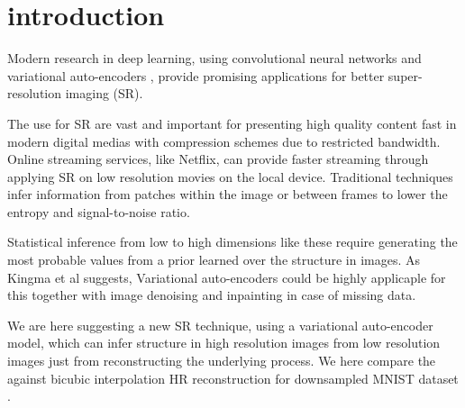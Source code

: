 \section{introduction}
\label{sec:introduction}
Modern research in deep learning, using convolutional neural networks \cite{Dong15} and variational auto-encoders \cite{Kingma2013} \cite{Johnson16}, provide promising applications for better super-resolution imaging (SR).  

The use for SR are vast and important for presenting high quality content fast in modern digital medias with compression schemes due to restricted bandwidth. Online streaming services, like Netflix, can provide faster streaming through applying SR on low resolution movies on the local device. Traditional techniques infer information from patches within the image or between frames to lower the entropy and signal-to-noise ratio. 

Statistical inference from low to high dimensions like these require generating the most probable values from a prior learned over the structure in images. As Kingma et al \cite{Kingma2013} suggests, Variational auto-encoders could be highly applicaple for this together with image denoising and inpainting in case of missing data.

We are here suggesting a new SR technique, using a variational auto-encoder model, which can infer structure in high resolution images from low resolution images just from reconstructing the underlying process. We here compare the against bicubic interpolation HR reconstruction for downsampled MNIST dataset \cite{MNIST}.
 